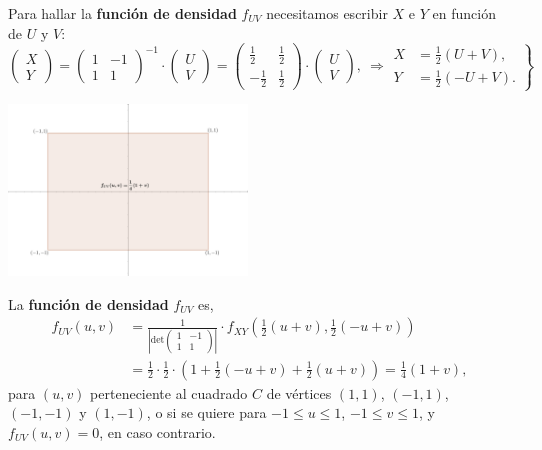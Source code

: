 \documentclass[
  letterpaper,
  DIV=11,
  numbers=noendperiod]{scrreprt}
\begin{document}
Para hallar la \textbf{función de densidad} \(f_{UV}\) necesitamos
escribir \(X\) e \(Y\) en función de \(U\) y \(V\): \[
\begin{pmatrix}X\\ Y\end{pmatrix}=\begin{pmatrix}1 & -1\\ 1& 1\end{pmatrix}^{-1}\cdot\begin{pmatrix}U\\ V\end{pmatrix}=\begin{pmatrix}\frac{1}{2} & \frac{1}{2}\\ -\frac{1}{2}& \frac{1}{2}\end{pmatrix}\cdot\begin{pmatrix}U\\ V\end{pmatrix},\ \Rightarrow \left.\begin{array}{rl}X & = \frac{1}{2}(U+V),\\ Y & =\frac{1}{2}(-U+V).\end{array}\right\}
\]

\includegraphics[width=2.5in,height=\textheight]{Images/EjTranLineal2.png}

La \textbf{función de densidad} \(f_{UV}\) es, \[
\begin{array}{rl}
f_{UV}(u,v) & =\frac{1}{\left|\mathrm{det}\begin{pmatrix}1 & -1\\ 1& 1\end{pmatrix}\right|}\cdot f_{XY}\left(\frac{1}{2}(u+v),\frac{1}{2}(-u+v)\right) \\ & =\frac{1}{2}\cdot \frac{1}{2}\cdot \left(1+\frac{1}{2}(-u+v)+\frac{1}{2}(u+v)\right)=\frac{1}{4}(1+v),
\end{array}
\] para \((u,v)\) perteneciente al cuadrado \(C\) de vértices \((1,1)\),
\((-1,1)\), \((-1,-1)\) y \((1,-1)\), o si se quiere para
\(-1\leq u\leq 1\), \(-1\leq v\leq 1\), y \(f_{UV}(u,v)=0\), en caso
contrario.
\end{document}
